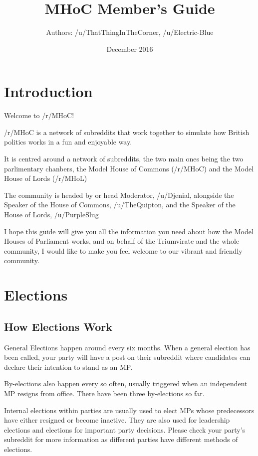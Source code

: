 \documentclass{article}
\title{MHoC Member's Guide}
\author{Authors: /u/ThatThingInTheCorner, /u/Electric-Blue}
\date{December 2016}
\begin{document}
\maketitle

\section{Introduction}
Welcome to /r/MHoC!

/r/MHoC is a network of subreddits that work together to simulate how British politics works in a fun and enjoyable way.

It is centred around a network of subreddits, the two main ones being the two parlimentary chanbers, the Model House of Commons (/r/MHoC) and the Model House of Lords (/r/MHoL)

The community is headed by or head Moderator, /u/Djenial, alongside the Speaker of the House of Commons, /u/TheQuipton, and the Speaker of the House of Lords, /u/PurpleSlug

I hope this guide will give you all the information you need about how the Model Houses of Parliament works, and on behalf of the Triumvirate and the whole community, I would like to make you feel welcome to our vibrant and friendly community.

\section{Elections}
\subsection{How Elections Work}
General Elections happen around every six months. When a general election has been called, your party will have a post on their subreddit where candidates can declare their intention to stand as an MP.

By-elections also happen every so often, usually triggered when an independent MP resigns from office. There have been three by-elections so far.

Internal elections within parties are usually used to elect MPs whose predecessors have either resigned or become inactive. They are also used for leadership elections and elections for important party decisions. Please check your party's subreddit for more information as different parties have different methods of elections.
\end{document}
